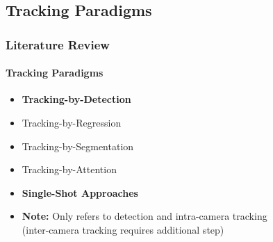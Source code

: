 \subsection{Tracking Paradigms}
\begin{frame}
    \frametitle{Literature Review}
    \framesubtitle{Tracking Paradigms}

    \begin{itemize}
        \item<1->\textbf{Tracking-by-Detection}
              \vspace{5pt}
        \item<2->Tracking-by-Regression
              \vspace{5pt}
        \item<3->Tracking-by-Segmentation
              \vspace{5pt}
        \item<4->Tracking-by-Attention
              \vspace{5pt}
        \item<5->\textbf{Single-Shot Approaches}
              \vspace{10pt}
        \item<8->\textbf{Note:} Only refers to detection and intra-camera tracking\\(inter-camera tracking requires additional step)
    \end{itemize}
\end{frame}

